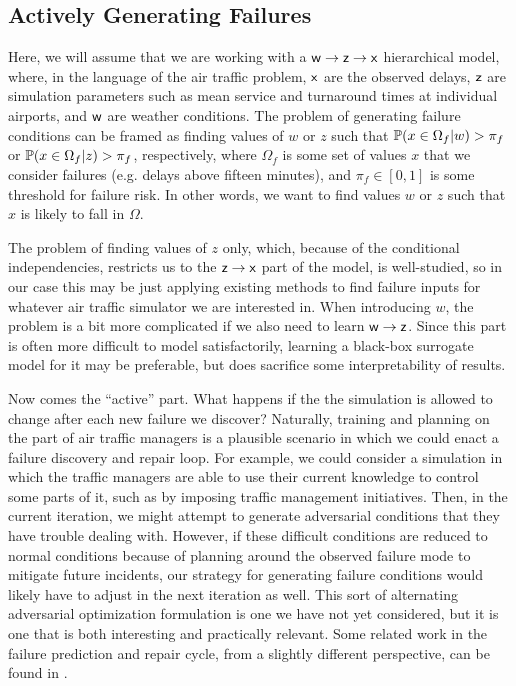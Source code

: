 \subsection{Actively Generating Failures} 

Here, we will assume that we are working with a $\mathsf w\to \mathsf z\to \mathsf x$ hierarchical model, where, in the language of the air traffic problem, $\mathsf x$ are the observed delays, $\mathsf z$ are simulation parameters such as mean service and turnaround times at individual airports, and $\mathsf w$ are weather conditions. The problem of generating failure conditions can be framed as finding values of $w$ or $z$ such that $\mathbb P(x\in \Omega_f| w)>\pi_f$ or $\mathbb P(x\in\Omega_f| z)>\pi_f$, respectively, where $\Omega_f$ is some set of values $x$ that we consider failures (e.g. delays above fifteen minutes), and $\pi_f\in [0,1]$ is some threshold for failure risk. In other words, we want to find values $w$ or $z$ such that $x$ is likely to fall in $\Omega$.

The problem of finding values of $z$ only, which, because of the conditional independencies, restricts us to the $\mathsf z \to \mathsf x$ part of the model, is well-studied, so in our case this may be just applying existing methods to find failure inputs for whatever air traffic simulator we are interested in. When introducing $w$, the problem is a bit more complicated if we also need to learn $\mathsf w\to\mathsf z$. Since this part is often more difficult to model satisfactorily, learning a black-box surrogate model for it may be preferable, but does sacrifice some interpretability of results.

Now comes the ``active'' part. What happens if the the simulation is allowed to change after each new failure we discover? Naturally, training and planning on the part of air traffic managers is a plausible scenario in which we could enact a failure discovery and repair loop. For example, we could consider a simulation in which the traffic managers are able to use their current knowledge to control some parts of it, such as by imposing traffic management initiatives. Then, in the current iteration, we might attempt to generate adversarial conditions that they have trouble dealing with. However, if these difficult conditions are reduced to normal conditions because of planning around the observed failure mode to mitigate future incidents, our strategy for generating failure conditions would likely have to adjust in the next iteration as well. This sort of alternating adversarial optimization formulation is one we have not yet considered, but it is one that is both interesting and practically relevant. Some related work in the failure prediction and repair cycle, from a slightly different perspective, can be found in \cite{dawson2024breaking, 10925872, DBLP:journals/corr/abs-2203-02038}.
